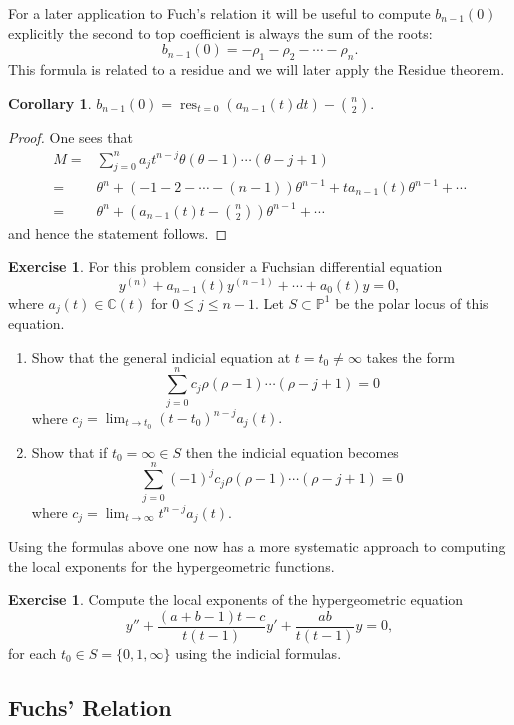 \documentclass[]{book}
\numberwithin{equation}{section}
\newtheorem{corollary}[theorem]{Corollary}
\theoremstyle{definition}
\newtheorem{exercise}[theorem]{Exercise}
\theoremstyle{remark}
\newcommand{\CC}{\mathbb{C}}
\newcommand{\PP}{\mathbb{P}}
\newcommand{\res}{\operatorname{res}}
\begin{document}
For a later application to Fuch's relation it will be useful to compute $b_{n-1}(0)$ explicitly the second to top coefficient is always the sum of the roots:
 $$ b_{n-1}(0) = -\rho_1 -\rho_2 - \cdots - \rho_n.$$
This formula is related to a residue and we will later apply the Residue theorem.
\begin{corollary}\label{C:residue-formula}
	 $ b_{n-1}(0) = \res_{t=0}( a_{n-1}(t)dt ) - {n \choose 2}.$
\end{corollary}
\begin{proof}
One sees that 
\begin{align*}
M =& \sum_{j=0}^n a_j t^{n-j} \theta(\theta-1)\cdots(\theta-j+1) \\
=& \theta^n + (-1-2-\cdots-(n-1))\theta^{n-1} + ta_{n-1}(t) \theta^{n-1} + \cdots \\
=& \theta^n + \left( a_{n-1}(t)t - {n \choose 2} \right)\theta^{n-1} + \cdots  
\end{align*}
and hence the statement follows.
\end{proof}

\begin{exercise}
	For this problem consider a Fuchsian differential equation 
	 $$ y^{(n)} + a_{n-1}(t) y^{(n-1)} + \cdots + a_0(t) y =0,$$
	where $a_j(t) \in \CC(t)$ for $0\leq j \leq n-1$.
	Let $S\subset \PP^1$ be the polar locus of this equation. 
	\begin{enumerate}
		\item Show that the general indicial equation at $t=t_0\neq \infty$ takes the form
		 $$ \sum_{j=0}^n c_j \rho(\rho-1)\cdots(\rho-j+1) =0 $$
		where $c_j = \lim_{t\to t_0} (t-t_0)^{n-j}a_j(t).$
		\item Show that if $t_0=\infty \in S$ then the indicial equation becomes 
		 $$ \sum_{j=0}^n (-1)^j c_j \rho(\rho-1)\cdots(\rho-j+1) =0 $$
		 where $c_j = \lim_{t\to \infty} t^{n-j} a_j(t)$. 
	\end{enumerate}
\end{exercise}
Using the formulas above one now has a more systematic approach to computing the local exponents for the hypergeometric functions. 
\begin{exercise}
	Compute the local exponents of the hypergeometric equation 
	 $$ y'' + \dfrac{(a+b-1)t -c}{t(t-1)}y' + \dfrac{ab}{t(t-1)} y =0, $$
	for each $t_0 \in S = \lbrace 0,1,\infty\rbrace$ using the indicial formulas. 
\end{exercise}


\subsection{Fuchs' Relation}
\end{document}
